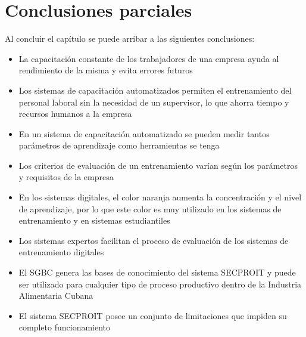 \section{Conclusiones parciales}
Al concluir el capítulo se puede arribar a las siguientes conclusiones:
\begin{itemize}
\item La capacitación constante de los trabajadores de una empresa ayuda al rendimiento de la misma y evita errores futuros
\item Los sistemas de capacitación automatizados permiten el entrenamiento del personal laboral sin la necesidad de un supervisor, lo que ahorra tiempo y recursos humanos a la empresa
\item En un sistema de capacitación automatizado se pueden medir tantos parámetros de aprendizaje como herramientas se tenga
\item Los criterios de evaluación de un entrenamiento varían según los parámetros y requisitos de la empresa
\item En los sistemas digitales, el color naranja aumenta la concentración y el nivel de aprendizaje, por lo que este color es muy utilizado en los sistemas de entrenamiento y en sistemas estudiantiles
\item Los sistemas expertos facilitan el proceso de evaluación de los sistemas de entrenamiento digitales
\item El SGBC genera las bases de conocimiento del sistema SECPROIT y puede ser utilizado para cualquier tipo de proceso productivo dentro de la Industria Alimentaria Cubana
\item El sistema SECPROIT posee un conjunto de limitaciones que impiden su completo funcionamiento
\end{itemize}
